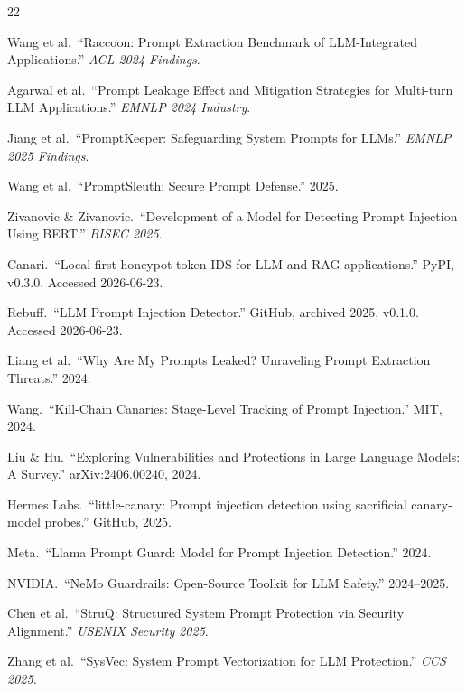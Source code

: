 \documentclass[11pt,a4paper]{article}
\begin{document}
\begin{thebibliography}{22}

Wang et al.\ ``Raccoon: Prompt Extraction Benchmark of LLM-Integrated Applications.''
\textit{ACL 2024 Findings}.

Agarwal et al.\ ``Prompt Leakage Effect and Mitigation Strategies for Multi-turn LLM Applications.''
\textit{EMNLP 2024 Industry}.

Jiang et al.\ ``PromptKeeper: Safeguarding System Prompts for LLMs.''
\textit{EMNLP 2025 Findings}.

Wang et al.\ ``PromptSleuth: Secure Prompt Defense.'' 2025.

Zivanovic \& Zivanovic.\ ``Development of a Model for Detecting Prompt Injection Using BERT.''
\textit{BISEC 2025}.

Canari.\ ``Local-first honeypot token IDS for LLM and RAG applications.'' PyPI, v0.3.0. Accessed 2026-06-23.

Rebuff.\ ``LLM Prompt Injection Detector.'' GitHub, archived 2025, v0.1.0. Accessed 2026-06-23.

Liang et al.\ ``Why Are My Prompts Leaked? Unraveling Prompt Extraction Threats.'' 2024.

Wang.\ ``Kill-Chain Canaries: Stage-Level Tracking of Prompt Injection.'' MIT, 2024.

Liu \& Hu.\ ``Exploring Vulnerabilities and Protections in Large Language Models: A Survey.'' arXiv:2406.00240, 2024.

Hermes Labs.\ ``little-canary: Prompt injection detection using sacrificial canary-model probes.'' GitHub, 2025.

Meta.\ ``Llama Prompt Guard: Model for Prompt Injection Detection.'' 2024.

NVIDIA.\ ``NeMo Guardrails: Open-Source Toolkit for LLM Safety.'' 2024--2025.

Chen et al.\ ``StruQ: Structured System Prompt Protection via Security Alignment.'' \textit{USENIX Security 2025}.

Zhang et al.\ ``SysVec: System Prompt Vectorization for LLM Protection.'' \textit{CCS 2025}.


\end{thebibliography}
\end{document}
